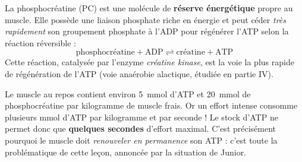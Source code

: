 \documentclass[11pt]{article}
\newcommand{\cle}[1]{{\popxbold\color{popdark}#1}}
\begin{document}
\begin{definition}[La phosphocréatine]
La \cle{phosphocréatine} (PC) est une molécule de \textbf{réserve énergétique} propre au muscle. Elle possède une liaison phosphate riche en énergie et peut céder \emph{très rapidement} son groupement phosphate à l'ADP pour régénérer l'ATP selon la réaction réversible :
\[ \text{phosphocréatine} + \text{ADP} \rightleftharpoons \text{créatine} + \text{ATP} \]
Cette réaction, catalysée par l'enzyme \emph{créatine kinase}, est la voie la plus rapide de régénération de l'ATP (voie anaérobie alactique, étudiée en partie IV).
\end{definition}

\begin{exemplebox}
Le muscle au repos contient environ \SI{5}{mmol} d'ATP et \SI{20}{mmol} de phosphocréatine par kilogramme de muscle frais. Or un effort intense consomme plusieurs mmol d'ATP par kilogramme et par seconde ! Le stock d'ATP ne permet donc que \textbf{quelques secondes} d'effort maximal. C'est précisément pourquoi le muscle doit \emph{renouveler en permanence} son ATP : c'est toute la problématique de cette leçon, annoncée par la situation de Junior.
\end{exemplebox}
\end{document}
